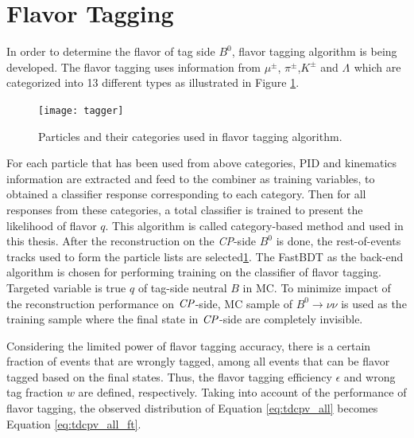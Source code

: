 \section{Flavor Tagging}
 In order to determine the flavor of tag side $B^0$, flavor tagging algorithm is being developed. The flavor tagging uses information from $\mu^{\pm}$, $\pi^{\pm}$,$K^{\pm}$ and $\Lambda^{}$ which are categorized into 13 different types as illustrated in Figure \ref{fig:flavortagger}. 

\begin{figure}[H]
\centering
\texttt{[image: tagger]}
\caption{Particles and their categories used in flavor tagging algorithm\cite{flavortagger}.}
\label{fig:flavortagger}
\end{figure}
 
 
For each particle that has been used from above categories, PID and kinematics information are extracted and feed to the combiner as training variables, to obtained a classifier response corresponding to each category. Then for all responses from these categories, a total classifier is trained to present the likelihood of flavor $q$. This algorithm is called category-based method and used in this thesis. After the reconstruction on the \textit{CP}-side $B^0$ is done, the rest-of-events tracks used to form the particle lists are selected\ref{fig:flavortagger}. The FastBDT as the back-end algorithm is chosen for performing training on the classifier of flavor tagging. Targeted variable is true $q$ of tag-side neutral $B$ in MC. To minimize impact of the reconstruction performance on $\it{CP}$-side, MC sample of $B^0 \to \nu \nu$ is used as the training sample where the final state in $\it{CP}$-side are completely invisible. 

Considering the limited power of flavor tagging accuracy, there is a certain fraction of events that are wrongly tagged, among all events that can be flavor tagged based on the final states. Thus, the flavor tagging efficiency $\epsilon$ and wrong tag fraction $w$ are defined, respectively. Taking into account of the performance of flavor tagging, the observed distribution of Equation \ref{eq:tdcpv_all} becomes Equation \ref{eq:tdcpv_all_ft}.

